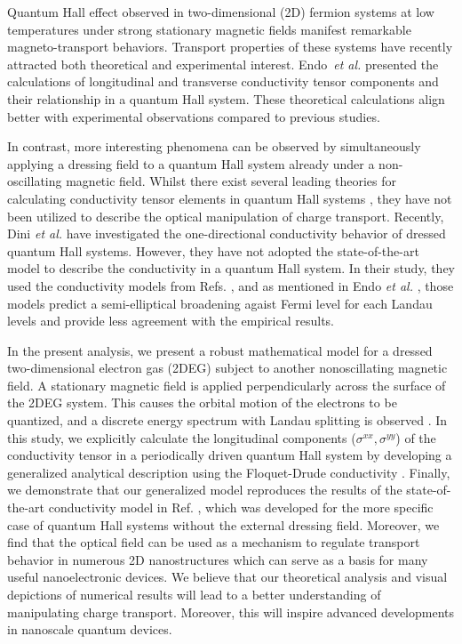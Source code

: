 Quantum Hall effect \cite{girvin90} observed in two-dimensional (2D) fermion systems at low temperatures under strong stationary magnetic fields manifest remarkable magneto-transport behaviors. Transport properties of these systems have recently attracted both theoretical \cite{ando72,ando74_1,ando74_2,ando74_3,ando74_4,ando82,endo09} and experimental \cite{allerman95,tieke97,pan05} interest.
Endo \textit{et al.} \cite{endo09} presented the calculations of longitudinal and transverse conductivity tensor components and their relationship in a quantum Hall system. These theoretical calculations  align better with experimental observations compared to previous studies.

In contrast, more interesting phenomena can be observed by simultaneously applying a dressing field to a quantum Hall system already under a non-oscillating magnetic field.
Whilst there exist several leading theories for calculating conductivity tensor elements in quantum Hall systems \cite{ando74_1,ando82,endo09}, they have not been utilized to describe the optical manipulation of charge transport.
Recently, Dini \textit{et al.} \cite{dini16} have investigated the one-directional conductivity behavior of dressed quantum Hall systems. However, they have not adopted the state-of-the-art model to describe the conductivity in a quantum Hall system. In their study, they used the conductivity models from Refs. \cite{ando74_1,ando82}, and as mentioned in Endo \textit{et al.} \cite{endo09}, those models predict a semi-elliptical broadening agaist Fermi level for each Landau levels and provide less agreement with the empirical results.

In the present analysis, we present a robust mathematical model for a dressed two-dimensional electron gas (2DEG) subject to another nonoscillating magnetic field.
A stationary magnetic field is applied perpendicularly across the surface of the 2DEG system. This causes the orbital motion of the electrons to be quantized, and a discrete energy spectrum with Landau splitting is observed \cite{landau30}.
In this study, we explicitly calculate the longitudinal components ($\sigma^{xx},\sigma^{yy}$) of the conductivity tensor in a periodically driven quantum Hall system by developing a generalized analytical description using the Floquet-Drude conductivity \cite{wackerl20}.
Finally, we demonstrate that our generalized model reproduces the results of the state-of-the-art conductivity model in Ref. \cite{endo09}, which was developed for the more specific case of quantum Hall systems without the external dressing field.
Moreover, we find that the optical field can be used as a mechanism to regulate transport behavior in numerous 2D nanostructures which can serve as a basis for many useful nanoelectronic devices. We believe that our theoretical analysis and visual depictions of numerical results will lead to a better understanding of manipulating charge transport. Moreover, this will inspire advanced  developments in nanoscale quantum devices.

